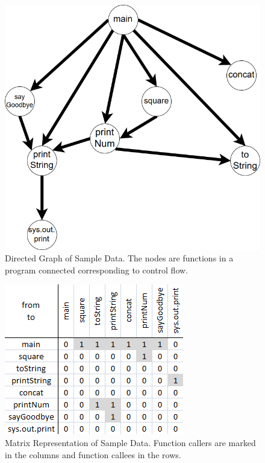 \begin{figure}[H]
  \centering
  \includegraphics[scale=0.5]{images/Reordering_Example_graph.png}
  \caption{Directed Graph of Sample Data. The nodes are functions in a program connected corresponding to control flow.\label{fig:reordering_example_graph}}
\end{figure}

\begin{figure}[H]
  \centering
  \includegraphics[scale=0.9]{images/Reordering_Example_matrix.png}
  \caption{Matrix Representation of Sample Data. Function callers are marked in the columns and function callees in the rows. \label{fig:reordering_example_matrix}}
\end{figure}

